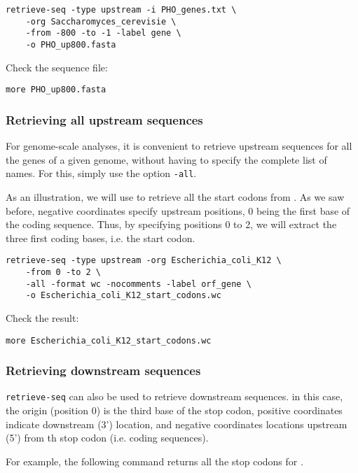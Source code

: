 \begin{verbatim}
retrieve-seq -type upstream -i PHO_genes.txt \
    -org Saccharomyces_cerevisie \
    -from -800 -to -1 -label gene \
    -o PHO_up800.fasta
\end{verbatim} 

Check the sequence file:

\begin{verbatim}
more PHO_up800.fasta
\end{verbatim}

\subsubsection{Retrieving all upstream sequences}

For genome-scale analyses, it is convenient to retrieve upstream
sequences for all the genes of a given genome, without having to
specify the complete list of names. For this, simply use the option
\texttt{-all}.

As an illustration, we will use \command{retrieve-seq} to retrieve all
the start codons from . As we saw before,
negative coordinates specify upstream positions, 0 being the first
base of the coding sequence. Thus, by specifying positions 0 to 2, we
will extract the three first coding bases, i.e. the start codon. 

\begin{verbatim}
retrieve-seq -type upstream -org Escherichia_coli_K12 \
    -from 0 -to 2 \
    -all -format wc -nocomments -label orf_gene \
    -o Escherichia_coli_K12_start_codons.wc
\end{verbatim}

Check the result:

\begin{verbatim}
more Escherichia_coli_K12_start_codons.wc
\end{verbatim}

\subsubsection{Retrieving downstream sequences}

\texttt{retrieve-seq} can also be used to retrieve downstream
sequences. in this case, the origin (position 0) is the third base of
the stop codon, positive coordinates indicate downstream (3')
location, and negative coordinates locations upstream (5') from th
stop codon (i.e. coding sequences). 

For example, the following command returns all the stop codons for
\organism{Escherichia coli}.

